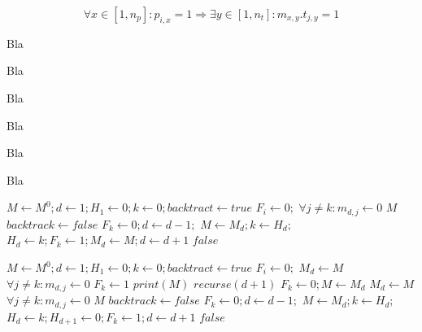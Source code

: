 \documentclass[a4paper, 12pt, ]{book}
\begin{document}
\begin{equation}
\label{eq:ullmann3}
\forall x \in [1, n_p] : p_{i,x} = 1 \Rightarrow \exists y \in [1, n_t] : m_{x,y}.t_{j,y} = 1
\end{equation}

Bla

Bla

Bla

Bla

Bla

Bla
\begin{algorithm}
\label{alg:ullmann1}
\begin{algorithmic}[1]
	\State $M \gets M^0; d \gets 1; H_1 \gets 0; k \gets 0; backtract \gets true$
	 $F_i \gets 0;$ \EndFor
			\State $\forall j \not = k : m_{d,j} \gets 0$
				\State \Return $M$
			\EndIf
			\State $backtrack \gets false$
		\EndIf
			\State $F_k \gets 0; d \gets d-1;$
				\State $M \gets M_d; k \gets H_d;$
			\EndIf
		\Else
			\State $H_d \gets k; F_k \gets 1; M_d \gets M; d \gets d+1$
		\EndIf
	\EndWhile
	\State \Return $false$	
\end{algorithmic}
\end{algorithm}

\begin{algorithm}
\label{alg:ullmann1}
\begin{algorithmic}[1]
	\State $M \gets M^0; d \gets 1; H_1 \gets 0; k \gets 0; backtract \gets true$
	 $F_i \gets 0;$ \EndFor
	\State
		\State $M_d \gets M$
		\If{$[! \; refine(M, P, T)\; ]$}
			\State \Return
		\EndIf
				\State $\forall j \not = k : m_{d,j} \gets 0$
				\State $F_k \gets 1$
						\State $print(M)$
					\EndIf
				\Else
					\State $recurse(d+1)$
				\EndIf
				\State $F_k \gets 0; M \gets M_d$
			\EndIf
		\EndFor
	\EndFunction
	\State
			\State $M_d \gets M$
			\State $\forall j \not = k : m_{d,j} \gets 0$
				\State \Return $M$
			\EndIf
			\State $backtrack \gets false$
		\EndIf
			\State $F_k \gets 0; d \gets d-1;$
				\State $M \gets M_d; k \gets H_d;$
			\EndIf
		\Else
			\State $H_d \gets k; H_{d+1} \gets 0;  F_k \gets 1; d \gets d+1$
		\EndIf
	\EndWhile
	\State \Return $false$	
\end{algorithmic}
\end{algorithm}
\end{document}
